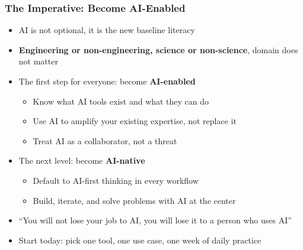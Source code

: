  
\begin{frame}[fragile]\frametitle{The Imperative: Become AI-Enabled}
\begin{itemize}
  \item AI is not optional, it is the new baseline literacy
  \item \textbf{Engineering or non-engineering, science or non-science}, domain does not matter
  \item The first step for everyone: become \textbf{AI-enabled}
    \begin{itemize}
      \item Know what AI tools exist and what they can do
      \item Use AI to amplify your existing expertise, not replace it
      \item Treat AI as a collaborator, not a threat
    \end{itemize}
  \item The next level: become \textbf{AI-native}
    \begin{itemize}
      \item Default to AI-first thinking in every workflow
      \item Build, iterate, and solve problems with AI at the center
    \end{itemize}
  \item ``You will not lose your job to AI, you will lose it to a person who uses AI''
  \item Start today: pick one tool, one use case, one week of daily practice
\end{itemize}
\end{frame}

